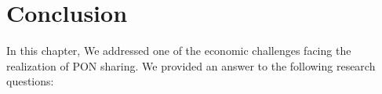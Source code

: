 
\section{Conclusion} \label{auct:conclution}
In this chapter, We addressed one of the economic challenges facing the realization of \ac{PON} sharing. We provided an answer to the following research questions: 

